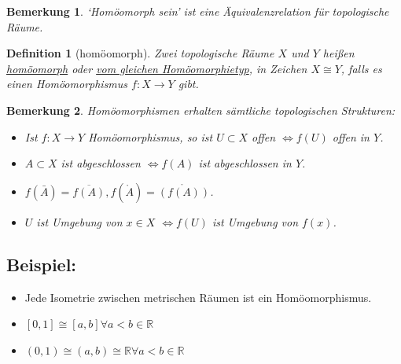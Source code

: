 \documentclass[a4paper,11pt,notitlepage]{report}
\newtheorem{definition}{Definition}[chapter]
\newtheorem{remark}{Bemerkung}[chapter]
\newcommand{\R}{{\ensuremath{\mathbb{R}}}}
\newenvironment{bsp}[1]
{
\setlength{\fboxsep}{10pt}
\subsection*{Beispiel: #1}
\begin{upshape}
}
{
\end{upshape}
}
\begin{document}
\begin{remark}
	`Homöomorph sein' ist eine Äquivalenzrelation für topologische Räume.
\end{remark}

\begin{definition}[homöomorph]
	Zwei topologische Räume $X$ und $Y$ heißen \underline{homöomorph} oder \underline{vom gleichen Homöomorphietyp}, in Zeichen $X \cong Y$, falls es einen Homöomorphismus $f \colon X \rightarrow Y$ gibt.
\end{definition}

\begin{remark}
	Homöomorphismen erhalten sämtliche topologischen Strukturen:
	\begin{itemize}
		\item Ist $f \colon X \rightarrow Y$ Homöomorphismus, so ist $U \subset X$ offen $\Leftrightarrow f(U)$ offen in $Y$.
		\item $A \subset X$ ist abgeschlossen $\Leftrightarrow f(A)$ ist abgeschlossen in $Y$.
		\item $f(\bar{A}) = \overline{f(A)}, f(\mathring A) = \mathring{\left(f(A)\right)}$.
		\item $U$ ist Umgebung von $x \in X$ $\Leftrightarrow f(U)$ ist Umgebung von $f(x)$.
	\end{itemize}
\end{remark}

\begin{bsp}{}
	\begin{itemize}
		\item Jede Isometrie zwischen metrischen Räumen ist ein Homöomorphismus.
		\item $[0,1] \cong [a,b] \forall a < b \in \R$
		\item $(0,1) \cong (a,b) \cong \R \forall a < b \in \R$
	\end{itemize}
\end{bsp}
\end{document}
